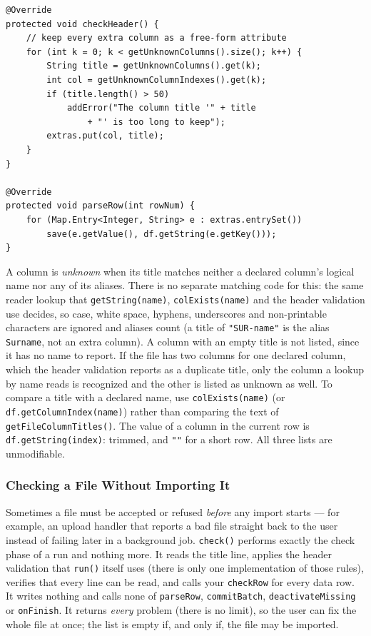\begin{lstlisting}[style=java]
@Override
protected void checkHeader() {
    // keep every extra column as a free-form attribute
    for (int k = 0; k < getUnknownColumns().size(); k++) {
        String title = getUnknownColumns().get(k);
        int col = getUnknownColumnIndexes().get(k);
        if (title.length() > 50)
            addError("The column title '" + title
                + "' is too long to keep");
        extras.put(col, title);
    }
}

@Override
protected void parseRow(int rowNum) {
    for (Map.Entry<Integer, String> e : extras.entrySet())
        save(e.getValue(), df.getString(e.getKey()));
}
\end{lstlisting}

A column is \emph{unknown} when its title matches neither a declared column's logical name nor any of its aliases.  There is no separate matching code for this: the same reader lookup that \texttt{getString(name)}, \texttt{colExists(name)} and the header validation use decides, so case, white space, hyphens, underscores and non-printable characters are ignored and aliases count (a title of \texttt{"SUR-name"} is the alias \texttt{Surname}, not an extra column).  A column with an empty title is not listed, since it has no name to report.  If the file has two columns for one declared column, which the header validation reports as a duplicate title, only the column a lookup by name reads is recognized and the other is listed as unknown as well.  To compare a title with a declared name, use \texttt{colExists(name)} (or \texttt{df.getColumnIndex(name)}) rather than comparing the text of \texttt{getFileColumnTitles()}.  The value of a column in the current row is \texttt{df.getString(index)}: trimmed, and \texttt{""} for a short row.  All three lists are unmodifiable.

\subsubsection*{Checking a File Without Importing It}
\label{sec:file-csv-check}

Sometimes a file must be accepted or refused \emph{before} any import starts --- for example, an upload handler that reports a bad file straight back to the user instead of failing later in a background job.  \texttt{check()} performs exactly the check phase of a run and nothing more.  It reads the title line, applies the header validation that \texttt{run()} itself uses (there is only one implementation of those rules), verifies that every line can be read, and calls your \texttt{checkRow} for every data row.  It writes nothing and calls none of \texttt{parseRow}, \texttt{commitBatch}, \texttt{deactivateMissing} or \texttt{onFinish}.  It returns \emph{every} problem (there is no limit), so the user can fix the whole file at once; the list is empty if, and only if, the file may be imported.


